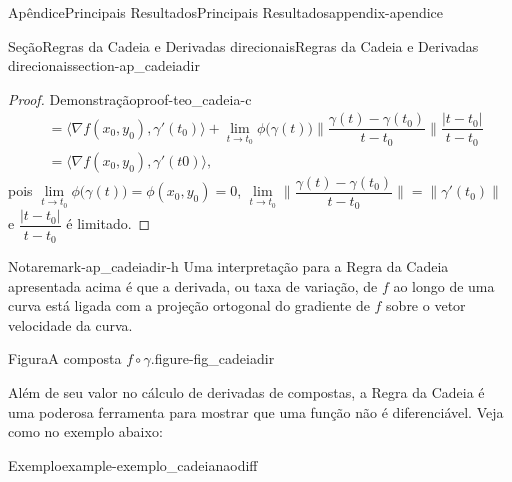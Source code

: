 \documentclass[oneside,10pt,]{book}
\numberwithin{equation}{section}
\begin{document}
\begin{appendixptx}{Apêndice}{Principais Resultados}{}{Principais Resultados}{}{}{appendix-apendice}
\begin{sectionptx}{Seção}{Regras da Cadeia e Derivadas direcionais}{}{Regras da Cadeia e Derivadas direcionais}{}{}{section-ap_cadeiadir}
\begin{proof}{Demonstração}{}{proof-teo_cadeia-c}
\begin{align*}
&
=\big\langle\nabla f(x_0,y_0),\gamma'(t_0)\big\rangle+
\lim\limits_{t\to t_0}
\phi\big(\gamma(t)\big)
\Big\|\dfrac{\gamma(t)-\gamma(t_0)}
{t-t_0}\Big\|\dfrac{|t-t_0|}{t-t_0}\\
&
=\big\langle\nabla f(x_0,y_0),\gamma'(t0)\big\rangle,
\end{align*}
pois \(\lim\limits_{t\to
t_0}\phi\big(\gamma(t)\big)=\phi(x_0,y_0)=0\), \(\lim\limits_{t\to t_0}\Big\|\dfrac{\gamma(t)-\gamma(t_0)}
{t-t_0}\Big\|=\big\|\gamma'(t_0)\|\) e \(\dfrac{|t-t_0|}{t-t_0}\) é limitado.%
\end{proof}
\begin{remark}{Nota}{}{remark-ap_cadeiadir-h}%
Uma interpretação para a Regra da Cadeia apresentada acima é que a derivada, ou taxa de variação, de \(f\) ao longo de uma curva está ligada com a projeção ortogonal do gradiente de \(f\) sobre o vetor velocidade da curva.%
\begin{figureptx}{Figura}{A composta \(f\circ\gamma\).}{figure-fig_cadeiadir}{}%
\begin{image}{0.05}{0.9}{0.05}{}%
%
\end{image}%
\tcblower
\end{figureptx}%
\end{remark}
Além de seu valor no cálculo de derivadas de compostas, a Regra da Cadeia é uma poderosa ferramenta para mostrar que uma função não é diferenciável. Veja como no exemplo abaixo:%
\begin{example}{Exemplo}{}{example-exemplo_cadeianaodiff}%

\end{example}
\end{sectionptx}
\end{appendixptx}
\end{document}

